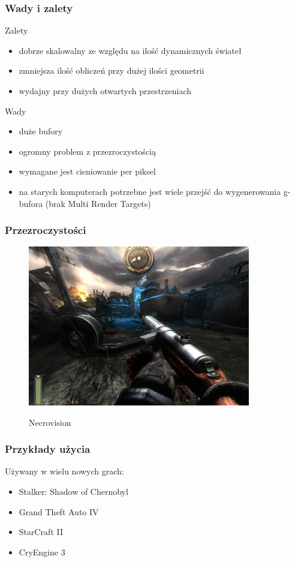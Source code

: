 \documentclass{beamer}
\begin{document}
\frame
{
	\frametitle{Wady i zalety}

	\begin{block}{Zalety}
	\begin{itemize}
	\item dobrze skalowalny ze względu na ilość dynamicznych świateł
		\item zmniejsza ilość obliczeń przy dużej ilości geometrii
		\item wydajny przy dużych otwartych przestrzeniach
		\end{itemize}
	\end{block}
	\begin{block}{Wady}
	\begin{itemize}
	\item duże bufory
		\item ogromny problem z przezroczystością
		\item wymagane jest cieniowanie per piksel
		\item na starych komputerach potrzebne jest wiele przejść do wygenerowania g-bufora (brak Multi Render Targets)
		\end{itemize}
	\end{block}
}

\frame
{
	\frametitle {Przezroczystości}

	\begin{figure}
	\centering
		\includegraphics[height=7cm]{img/necro.jpg}
	\label{fig:necro}
	\caption*{Necrovision}
	\end{figure}
}

\frame
{
	\frametitle{Przykłady użycia}

	Używany w wielu nowych grach:

		\begin{itemize}
	\item Stalker: Shadow of Chernobyl
		\item Grand Theft Auto IV
		\item StarCraft II
		\item CryEngine 3
		\end{itemize}
}
\end{document}
